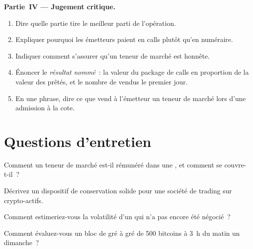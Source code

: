 \begin{problem}
\medskip\noindent\textbf{Partie~IV --- Jugement critique.}
\begin{enumerate}[resume]
\item Dire quelle partie tire le meilleur parti de l'opération.
\item Expliquer pourquoi les émetteurs paient en calls plutôt qu'en numéraire.
\item Indiquer comment s'assurer qu'un teneur de marché est honnête.
\item Énoncer le \emph{résultat nommé}~: la valeur du package de calls en proportion de la valeur des  prêtés, et le nombre de  vendus le premier jour.
\item En une phrase, dire ce que vend à l'émetteur un teneur de marché lors d'une admission à la cote.
\end{enumerate}
\end{problem}

\section{Questions d'entretien}

\begin{interviewq}\label{iq:m3:the-crypto-trading-business:1}
Comment un teneur de marché est-il rémunéré dans une , et comment se couvre-t-il~?
\end{interviewq}

\begin{interviewq}\label{iq:m3:the-crypto-trading-business:2}
Décrivez un dispositif de conservation solide pour une société de trading sur crypto-actifs.
\end{interviewq}

\begin{interviewq}\label{iq:m3:the-crypto-trading-business:3}
Comment estimeriez-vous la volatilité d'un  qui n'a pas encore été négocié~?
\end{interviewq}

\begin{interviewq}\label{iq:m3:the-crypto-trading-business:4}
Comment évaluez-vous un bloc de gré à gré de 500 bitcoins à 3~h du matin un dimanche~?
\end{interviewq}

